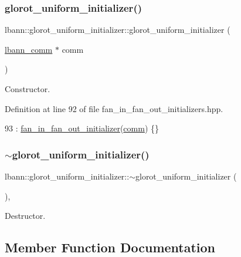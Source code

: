 \subsubsection{\texorpdfstring{glorot\+\_\+uniform\+\_\+initializer()}{glorot\_uniform\_initializer()}}
{\footnotesize\ttfamily lbann\+::glorot\+\_\+uniform\+\_\+initializer\+::glorot\+\_\+uniform\+\_\+initializer (\begin{DoxyParamCaption}\item[{\hyperlink{classlbann_1_1lbann__comm}{lbann\+\_\+comm} $\ast$}]{comm }\end{DoxyParamCaption})\hspace{0.3cm}{\ttfamily [inline]}}

Constructor. 

Definition at line 92 of file fan\+\_\+in\+\_\+fan\+\_\+out\+\_\+initializers.\+hpp.


\begin{DoxyCode}
93     : \hyperlink{classlbann_1_1fan__in__fan__out__initializer_a3a3811af11b1a70a57af846ae2cdf668}{fan\_in\_fan\_out\_initializer}(\hyperlink{file__io_8cpp_ab048c6f9fcbcfaa57ce68b00263dbebe}{comm}) \{\}
\end{DoxyCode}
\mbox{\label{classlbann_1_1glorot__uniform__initializer_ae48941eb831bc30cc405db1f4ef62583}} 
\subsubsection{\texorpdfstring{$\sim$glorot\+\_\+uniform\+\_\+initializer()}{~glorot\_uniform\_initializer()}}
{\footnotesize\ttfamily lbann\+::glorot\+\_\+uniform\+\_\+initializer\+::$\sim$glorot\+\_\+uniform\+\_\+initializer (\begin{DoxyParamCaption}{ }\end{DoxyParamCaption})\hspace{0.3cm}{\ttfamily [override]}, {\ttfamily [default]}}

Destructor. 

\subsection{Member Function Documentation}
\mbox{\label{classlbann_1_1glorot__uniform__initializer_a3c5790bf2e7b0e771d3ed1d93c8f255f}} 
